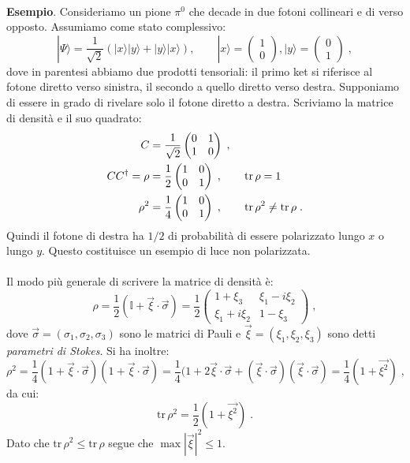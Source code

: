 \documentclass[10pt,a4paper]{report}
\theoremstyle{definition}
\numberwithin{equation}{section}
\newcommand{\ket}{\rangle}
\newcommand{\adj}[1]{#1^{\dagger}}
\newcommand{\tr}{\mathrm{tr}}
\begin{document}
\\
\textbf{Esempio}. Consideriamo un pione $\pi^0$ che decade in due fotoni collineari e di verso opposto. Assumiamo come stato complessivo:
\begin{equation}
|\Psi\ket=\frac{1}{\sqrt{2}}(|x\ket|y\ket+|y\ket|x\ket), \qquad |x\ket=\left(\begin{matrix}
1 \\
0
\end{matrix}\right), |y\ket=\left(\begin{matrix}
0 \\
1
\end{matrix}\right)\;,
\end{equation}
dove in parentesi abbiamo due prodotti tensoriali: il primo ket si riferisce al fotone diretto verso sinistra, il secondo a quello diretto verso destra. Supponiamo di essere in grado di rivelare solo il fotone diretto a destra. Scriviamo la matrice di densità e il suo quadrato:
\begin{align}
C&=\frac{1}{\sqrt{2}}\left(\begin{matrix}
0 & 1 \\
1 & 0
\end{matrix}\right)\;, \notag \\
C\adj{C}=\rho&=\frac{1}{2}\left(\begin{matrix}
1 & 0 \\
0 & 1
\end{matrix}\right)\;, \qquad \tr\,\rho=1 \notag \\
\rho^2&=\frac{1}{4}\left(\begin{matrix}
1 & 0 \\
0 & 1
\end{matrix}\right)\;, \qquad \tr\,\rho^2\ne \tr\,\rho\;.
\end{align}
Quindi il fotone di destra ha $1/2$ di probabilità di essere polarizzato lungo $x$ o lungo $y$. Questo costituisce un esempio di luce non polarizzata. \\
\\
Il modo più generale di scrivere la matrice di densità è:
\begin{equation}
\rho=\frac{1}{2}\left(\mathbb{I}+\vec{\xi}\cdot\vec{\sigma}\right)=\frac{1}{2}\left(\begin{matrix}
1+\xi_3 & \xi_1-i\xi_2 \\
\xi_1+i\xi_2 & 1-\xi_3
\end{matrix}\right)\;,
\end{equation}
dove $\vec{\sigma}=(\sigma_1,\sigma_2,\sigma_3)$ sono le matrici di Pauli e $\vec{\xi}=(\xi_1,\xi_2,\xi_3)$ sono detti \textit{parametri di Stokes}. Si ha inoltre:
\begin{equation}
\rho^2=\frac{1}{4}(1+\vec{\xi}\cdot\vec{\sigma})(1+\vec{\xi}\cdot\vec{\sigma})=\frac{1}{4}(1+2\vec{\xi}\cdot\vec{\sigma}+(\vec{\xi}\cdot\vec{\sigma})(\vec{\xi}\cdot\vec{\sigma})=\frac{1}{4}(1+\vec{\xi^2})\;,
\end{equation}
da cui:
\begin{equation}
\tr\,\rho^2=\frac{1}{2}(1+\vec{\xi^2})\;.
\end{equation}
Dato che $\tr\,\rho^2\le\tr\,\rho$ segue che $\max|\vec{\xi}|^2\le 1$.
\end{document}
